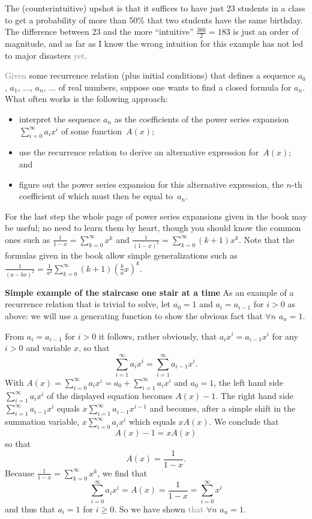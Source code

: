 \documentclass[titlepage]{article}
\theoremstyle{definition}
\numberwithin{equation}{subsection}
\numberwithin{remark}{subsection}
\begin{document}
The (counterintuitive) upshot is that it suffices to have just 23 students in a class to get a probability of more than 50\% that two students have the same birthday.
The difference between 23 and the more ``intuitive'' $\frac{366}2=183$ is just an order of magnitude,
and as far as I know the wrong intuition for this example has not led to major disasters \textcolor{gray}{yet}.


\textcolor{gray}{Given} some recurrence relation (plus initial conditions) that defines a sequence
$a_0$, $a_1$, $\ldots$, $a_n$, $\ldots$ of real numbers, suppose one wants to find a closed formula for $a_n$.
What often works is the following approach:
\begin{itemize}
\item interpret the sequence $a_n$ as the coefficients of the power series expansion
$\sum_{i=0}^\infty a_ix^i$ of some function~$A(x)$;
\item use the recurrence relation to derive an alternative expression for~$A(x)$; and
\item figure out the power series expansion for this alternative expression, the $n$-th coefficient of which must then be equal to~$a_n$.
\end{itemize} For the last step the whole page of power series expansions given in the book may be useful;
no need to learn them by heart, though you should know the common ones such as $\frac1{1-x}=\sum_{k=0}^\infty x^k$
and $\frac1{(1-x)^2}=\sum_{k=0}^\infty (k+1)x^k$.
Note that the formulas given in the book allow simple generalizations such as
$\frac1{(a-bx)^2}=\frac1{a^2}\sum_{k=0}^\infty (k+1)(\frac{b}{a}x)^k$.\\
\par\noindent
{\bf Simple example of the staircase one stair at a time}
As an example of a recurrence relation that is trivial to solve, let $a_0=1$ and $a_i=a_{i-1}$ for $i>0$ as above:
we will use a generating function to show the obvious fact that $\forall n\,\, a_n=1$.

From $a_i=a_{i-1}$ for $i>0$ it follows, rather obviously, that $a_ix^i=a_{i-1}x^i$ for any $i>0$
and variable $x$, so that
$$\sum_{i=1}^\infty a_ix^i=\sum_{i=1}^\infty a_{i-1}x^i.$$
With $A(x)=\sum_{i=0}^\infty a_ix^i = a_0+\sum_{i=1}^\infty a_ix^i$ and $a_0=1$, the left hand side $\sum_{i=1}^\infty a_ix^i$ of the displayed equation becomes $A(x)-1$.
The right hand side $\sum_{i=1}^\infty a_{i-1}x^i$ equals $x\sum_{i=1}^\infty a_{i-1}x^{i-1}$ and becomes, after a simple shift in the summation variable,
$x\sum_{i=0}^\infty a_{i}x^{i}$ which equals $xA(x)$. We conclude that 
$$A(x)-1=xA(x)$$so that $$A(x)=\frac1{1-x}.$$
Because $\frac1{1-x}=\sum_{k=0}^\infty x^k$, we find
that$$\sum_{i=0}^\infty a_ix^i=A(x)=\frac1{1-x}=\sum_{i=0}^\infty x^i$$and thus that $a_i=1$ for $i\ge 0$.
So we have shown \textcolor{gray}{that} $\forall n\,\, a_n=1$.\\
\par\noindent
\end{document}
